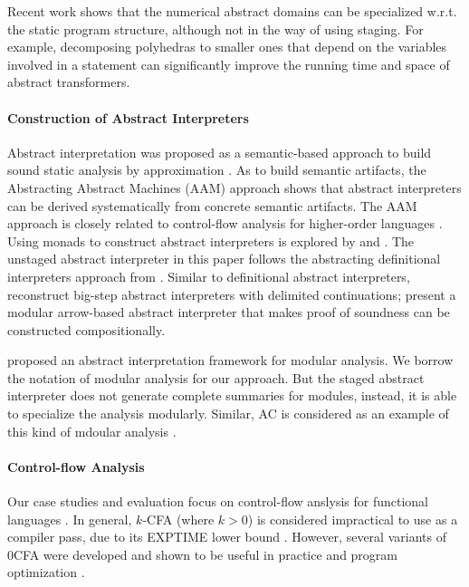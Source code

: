 Recent work shows that the numerical abstract domains can be
specialized w.r.t. the static program structure, although not in the
way of using staging. For example, decomposing polyhedras
\cite{DBLP:conf/popl/SinghPV17, Singh:2017:PCD:3177123.3158143} to
smaller ones that depend on the variables involved in a statement can
significantly improve the running time and space of abstract
transformers.

\paragraph{Construction of Abstract Interpreters} Abstract interpretation
was proposed as a semantic-based approach to build sound static analysis by
approximation \cite{DBLP:conf/popl/CousotC77}. As to build semantic
artifacts, the Abstracting Abstract Machines (AAM)
\cite{DBLP:journals/jfp/HornM12, DBLP:conf/icfp/HornM10} approach
shows that abstract interpreters can be derived systematically from
concrete semantic artifacts. The AAM approach is closely related to
control-flow analysis for higher-order languages
\cite{Midtgaard:2012:CAF:2187671.2187672}.  Using monads to construct
abstract interpreters is explored by
\citet{Sergey:2013:MAI:2491956.2491979} and
\citet{DBLP:journals/pacmpl/DaraisLNH17,
  Darais:2015:GTM:2814270.2814308}.  The unstaged abstract interpreter
in this paper follows the abstracting definitional interpreters
approach from \citet{DBLP:journals/pacmpl/DaraisLNH17}.  Similar to
definitional abstract interpreters,
\citet{Wei:2018:RAA:3243631.3236800} reconstruct big-step abstract
interpreters with delimited continuations;
\citet{Keidel:2018:CSP:3243631.3236767} present a modular arrow-based
abstract interpreter that makes proof of soundness can be constructed
compositionally.

\citet{DBLP:conf/cc/CousotC02} proposed an abstract interpretation framework for
modular analysis. We borrow the notation of modular analysis for our approach.
But the staged abstract interpreter does not generate complete summaries for
modules, instead, it is able to specialize the analysis modularly. Similar, AC
is considered as an example of this kind of mdoular analysis \cite{DBLP:conf/cc/CousotC02}.

\paragraph{Control-flow Analysis} Our case studies and evaluation focus on
control-flow anslysis for functional languages
\cite{Shivers:1991:SSC:115865.115884, Midtgaard:2012:CAF:2187671.2187672}. In
general, $k$-CFA (where $k > 0$) is considered impractical to use as a compiler
pass, due to its EXPTIME lower bound \cite{VanHorn:2008:DKC:1411204.1411243}.
However, several variants of 0CFA were developed and shown to be useful in
practice and program optimization \cite{Adams:2011:FTR:2048066.2048105,
Bergstrom:2014:PEH:2628136.2628153, ashley:practical, Reppy:2006:TCA:1159876.1159888}.

